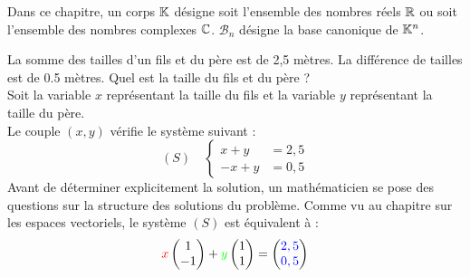 \documentclass{book}
\begin{document}
\begin{Texte}%
Dans ce chapitre, un corps $\mathbb{K}$ désigne soit l'ensemble des nombres réels $\mathbb{R}$ ou soit l'ensemble des nombres complexes $\mathbb{C}$.
$\mathcal{B}_n$ désigne la base canonique de $\mathbb{K}^n$.  
\end{Texte}
\begin{Exemple} %
La somme des tailles d'un fils et du père est de 2,5 mètres. La différence de tailles  est de 0.5 mètres.
Quel est la taille du fils et du père ? \\
Soit la variable $x$ représentant la taille du fils et la variable $y$ représentant la taille du père.\\
Le couple $(x,y)$ vérifie le système suivant  :
$$(S)\quad \begin{cases}
x+y&=2,5\\
-x+y&=0,5
\end{cases}
$$
Avant de déterminer explicitement la solution, un mathématicien se pose des questions sur la structure des solutions du problème. Comme vu au chapitre sur les espaces vectoriels, le système $(S)$ est équivalent à :
$$	
	 {\color{red}x}\begin{pmatrix}
 1    \\
 -1   \\
\end{pmatrix}+{\color{green}y}\begin{pmatrix}
  1   \\
  1  \\
\end{pmatrix}=\begin{pmatrix}
 {\color{blue}2,5}   \\
 {\color{blue}0,5}  \\
\end{pmatrix}$$

\end{Exemple}
\end{document}
